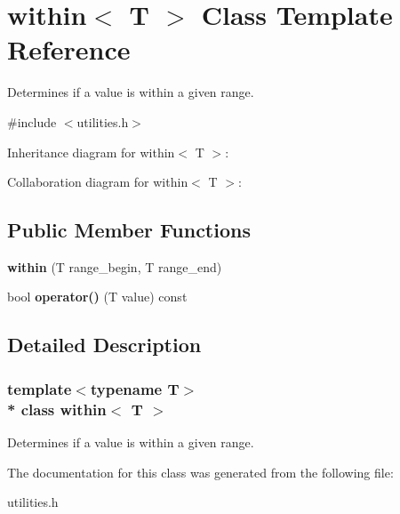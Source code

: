 \section{within$<$ T $>$ Class Template Reference}
\label{classwithin}


Determines if a value is within a given range.  




{\ttfamily \#include $<$utilities.\+h$>$}



Inheritance diagram for within$<$ T $>$\+:


Collaboration diagram for within$<$ T $>$\+:
\subsection*{Public Member Functions}
\begin{DoxyCompactItemize}
\item 
{\bf within} (T range\+\_\+begin, T range\+\_\+end)
\item 
bool {\bf operator()} (T value) const 
\end{DoxyCompactItemize}


\subsection{Detailed Description}
\subsubsection*{template$<$typename T$>$\\*
class within$<$ T $>$}

Determines if a value is within a given range. 

The documentation for this class was generated from the following file\+:\begin{DoxyCompactItemize}
\item 
utilities.\+h\end{DoxyCompactItemize}
